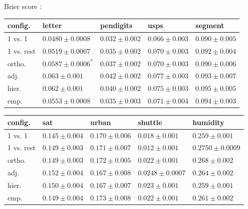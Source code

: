 \documentclass[a0,landscape]{a0poster}
\begin{document}
\begin{multicols}{4}
Brier score \citep{Jolliffe_Stephenson2003}:

{\small
\begin{tabular}{|l|llll|}
\hline
config. & letter & pendigits & usps & segment \\
\hline\hline
        1 vs. 1 & $\mathbf{0.0480 \pm 0.0008}$ & $\mathbf{0.032 \pm 0.002}$ & $\mathbf{0.066 \pm 0.003}$ & $0.090 \pm 0.005 $ \\
1 vs. rest & $0.0519 \pm 0.0007 $ & $0.035 \pm 0.002 $ & $0.070 \pm 0.003 $ & $0.092 \pm 0.004 $ \\
        ortho. & $0.0587 \pm 0.0006^*$ & $0.037 \pm 0.002 $ & $0.070 \pm 0.003 $ & $\mathbf{0.090 \pm 0.006}$ \\
adj. & $0.063 \pm 0.001 $ & $0.042 \pm 0.002 $ & $0.077 \pm 0.003 $ & $0.093 \pm 0.007 $ \\
hier. & $0.062 \pm 0.001 $ & $0.040 \pm 0.002 $ & $0.075 \pm 0.003 $ & $0.095 \pm 0.005 $ \\
emp. & $0.0553 \pm 0.0008 $ & $0.035 \pm 0.003 $ & $0.071 \pm 0.004 $ & $0.094 \pm 0.003 $ \\
\hline
\end{tabular}

\begin{tabular}{|l|llll|}
\hline
config. & sat & urban & shuttle & humidity\\
\hline\hline
        1 vs. 1 & $\mathbf{0.145 \pm 0.004}$ & $0.170 \pm 0.006 $ & $0.018 \pm 0.001 $ & $\mathbf{0.259 \pm 0.001}$ \\
        1 vs. rest & $0.149 \pm 0.003 $ & $0.171 \pm 0.007 $ & $\mathbf{0.012 \pm 0.001}$ & $0.2750 \pm 0.0009 $ \\
ortho. & $0.149 \pm 0.003 $ & $0.172 \pm 0.005 $ & $0.022 \pm 0.001 $ & $0.268 \pm 0.002 $ \\
        adj. & $0.152 \pm 0.004 $ & $\mathbf{0.167 \pm 0.008}$ & $0.0248 \pm 0.0007 $ & $0.264 \pm 0.002 $ \\
hier. & $0.150 \pm 0.004 $ & $0.167 \pm 0.007 $ & $0.023 \pm 0.001 $ & $0.259 \pm 0.001 $ \\
emp. & $0.149 \pm 0.004 $ & $0.173 \pm 0.008 $ & $0.022 \pm 0.001 $ & $0.261 \pm 0.002 $ \\
\hline
\end{tabular}
} %


\end{multicols}
\end{document}
